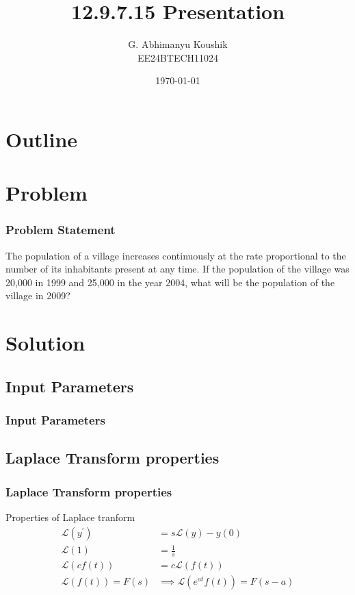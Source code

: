 \documentclass{beamer}
\title{12.9.7.15 Presentation}
\author{G. Abhimanyu Koushik \\ EE24BTECH11024}
\date{\today}
\providecommand{\brak}[1]{\ensuremath{\left(#1\right)}}
\theoremstyle{remark}
\numberwithin{equation}{section}
\begin{document}
\begin{frame}
\titlepage
\end{frame}

\section*{Outline}
\begin{frame}
\tableofcontents
\end{frame}
\section{Problem}
\begin{frame}
\frametitle{Problem Statement}
%
The population of a village increases continuously at the rate proportional to the number of its inhabitants present at any time. If the population of the village was 20,000 in 1999 and 25,000 in the year 2004, what will be the population of the village in 2009?
%
\end{frame}

\section{Solution}
\subsection{Input Parameters}
\begin{frame}
\frametitle{Input Parameters}
\begin{table}[H]    
  \centering
  
\end{table}
\end{frame}
\subsection{Laplace Transform properties}
\begin{frame}
\frametitle{Laplace Transform properties}
Properties of Laplace tranform
\begin{align}
	\mathcal{L}\brak{y^{\prime}} &= s\mathcal{L}\brak{y} -y\brak{0}\\
	\mathcal{L}\brak{1} &= \frac{1}{s}\\
	\mathcal{L}\brak{cf\brak{t}} &= c\mathcal{L}\brak{f\brak{t}}\\
	\mathcal{L}\brak{f\brak{t}} = F\brak{s} &\implies \mathcal{L}\brak{e^{at}f\brak{t}} = F\brak{s-a}	
\end{align}
\end{frame}
\end{document}
